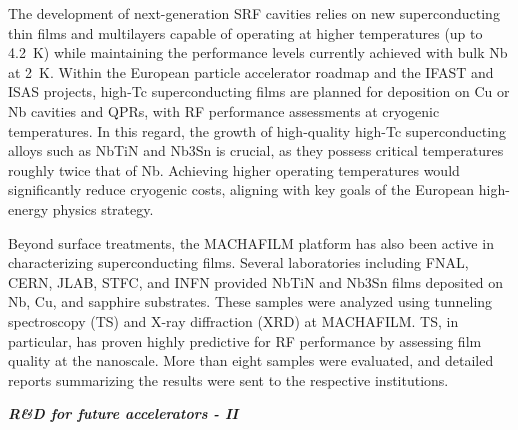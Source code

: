 The development of next-generation SRF cavities relies on new superconducting thin films and multilayers capable of operating at higher temperatures (up to \SI{4.2}{K}) while maintaining the performance levels currently achieved with bulk Nb at \SI{2}{K}. Within the European particle accelerator roadmap and the IFAST and ISAS projects, high-Tc superconducting films are planned for deposition on Cu or Nb cavities and QPRs, with RF performance assessments at cryogenic temperatures. In this regard, the growth of high-quality high-Tc superconducting alloys such as NbTiN and Nb3Sn is crucial, as they possess critical temperatures roughly twice that of Nb. Achieving higher operating temperatures would significantly reduce cryogenic costs, aligning with key goals of the European high-energy physics strategy.

Beyond surface treatments, the MACHAFILM platform has also been active in characterizing superconducting films. Several laboratories including FNAL, CERN, JLAB, STFC, and INFN provided NbTiN and Nb3Sn films deposited on Nb, Cu, and sapphire substrates. These samples were analyzed using tunneling spectroscopy (TS) and X-ray diffraction (XRD) at MACHAFILM. TS, in particular, has proven highly predictive for RF performance by assessing film quality at the nanoscale. More than eight samples were evaluated, and detailed reports summarizing the results were sent to the respective institutions.

\textbf{\textit{R\&D for future accelerators - II}} \mbox{}

